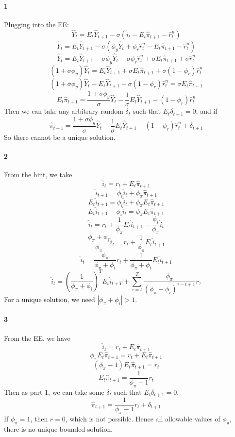 \documentclass[10pt,letter]{article}
\newcommand{\problempart}[1]{\paragraph{#1}}
\begin{document}
\problempart{1}
Plugging into the EE:
\[ \hat{Y}_t = E_t \hat{Y}_{t+1} - \sigma(\hat{i}_t - E_t \hat{\pi}_{t+1} - \hat{r}_t^n) \]
\[ \hat{Y}_t = E_t \hat{Y}_{t+1} - \sigma(\phi_y \hat{Y}_t + \phi_r \hat{r}^n_t - E_t \hat{\pi}_{t+1} - \hat{r}_t^n) \]
\[ \hat{Y}_t = E_t \hat{Y}_{t+1} - \sigma \phi_y \hat{Y}_t - \sigma  \phi_r \hat{r}^n_t + \sigma  E_t \hat{\pi}_{t+1} + \sigma  \hat{r}_t^n \]
\[ (1 + \sigma\phi_y)\hat{Y}_t = E_t \hat{Y}_{t+1} + \sigma  E_t \hat{\pi}_{t+1} + \sigma (1 - \phi_r)  \hat{r}_t^n \]
\[ (1 + \sigma\phi_y)\hat{Y}_t - E_t \hat{Y}_{t+1} - \sigma (1 - \phi_r)  \hat{r}_t^n =  \sigma  E_t \hat{\pi}_{t+1}  \]
\[  E_t \hat{\pi}_{t+1}= \frac{1 + \sigma\phi_y}{\sigma}\hat{Y}_t - \frac{1}{\sigma}E_t \hat{Y}_{t+1} -  (1 - \phi_r)  \hat{r}_t^n     \]
Then we can take any arbitrary random $\delta_{t}$ such that $E_t \delta_{t+1} = 0$, and if
\[ \hat{\pi}_{t+1}= \frac{1 + \sigma\phi_y}{\sigma}\hat{Y}_t - \frac{1}{\sigma}E_t \hat{Y}_{t+1} -  (1 - \phi_r)  \hat{r}_t^n + \delta_{t+1} \]
So there cannot be a unique solution.
\problempart{2}
From the hint, we take
\[ \hat{i}_t = r_t + E_t \hat{\pi}_{t+1} \]
\[ \hat{i}_{t+1} = \phi_i \hat{i}_t + \phi_\pi \hat{\pi}_{t+1} \]
\[ E_t \hat{i}_{t+1} = \phi_i \hat{i}_t + \phi_\pi E_t \hat{\pi}_{t+1} \]
\[  E_t \hat{i}_{t+1} - \phi_i \hat{i}_t = \phi_\pi E_t \hat{\pi}_{t+1} \]
\[ \hat{i}_t = r_t + \frac{1}{\phi_\pi}E_t \hat{i}_{t+1} - \frac{\phi_i}{\phi_\pi} \hat{i}_t \]
\[  \frac{\phi_\pi + \phi_i}{\phi_\pi} \hat{i}_t = r_t + \frac{1}{\phi_\pi}E_t \hat{i}_{t+1} \]
\[   \hat{i}_t = \frac{\phi_\pi}{\phi_\pi + \phi_i}r_t + \frac{1}{\phi_\pi + \phi_i}E_t \hat{i}_{t+1} \]
\[   \hat{i}_t = \left(\frac{1}{\phi_\pi + \phi_i}\right)^T E_t \hat{i}_{t+T}+ \sum_{\tau = t}^{T} \frac{\phi_\pi}{(\phi_\pi + \phi_i)^{\tau - t+1}}r_{\tau} \]
For a unique solution, we need $|\phi_\pi + \phi_i| > 1$.
\problempart{3}
From the EE, we have
\[ \hat{i}_t = r_t + E_t \hat{\pi}_{t+1} \]
\[ \phi_\pi E_t \hat{\pi}_{t+1}  = r_t + E_t \hat{\pi}_{t+1} \]
\[ (\phi_\pi-1) E_t \hat{\pi}_{t+1}  = r_t  \]
\[ E_t \hat{\pi}_{t+1}  = \frac{1}{\phi_\pi - 1}r_t  \]
Then as part 1, we can take some $\delta_t$ such that $E_t\delta_{t+1} = 0$,
\[ \hat{\pi}_{t+1} = \frac{1}{\phi_\pi - 1}r_t + \delta_{t+1} \]
If $\phi_\pi = 1$, then $r = 0$, which is not possible. Hence all allowable values of $\phi_\pi$, there is no unique bounded solution.
\end{document}
